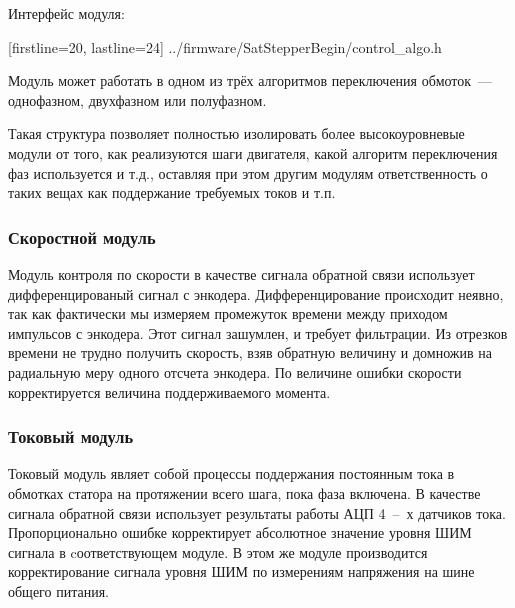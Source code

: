 Интерфейс модуля:

    [firstline=20, lastline=24]
    {../firmware/SatStepperBegin/control_algo.h}

Модуль может работать в одном из трёх
алгоритмов переключения обмоток~--- однофазном, двухфазном или полуфазном.

Такая структура позволяет полностью изолировать более высокоуровневые модули от
того, как реализуются шаги двигателя, какой алгоритм переключения фаз
используется и т.д., оставляя при этом другим модулям ответственность о таких
вещах как поддержание требуемых токов и т.п.

\subsubsection{Скоростной модуль}
Модуль контроля по скорости в качестве сигнала обратной связи использует
дифференцированый сигнал с энкодера. Дифференцирование происходит неявно,
так как фактически мы измеряем промежуток времени между приходом импульсов с
энкодера. Этот сигнал зашумлен, и требует фильтрации.
Из отрезков времени не трудно получить скорость, взяв обратную величину и
домножив на радиальную меру одного отсчета энкодера. По величине ошибки скорости
корректируется величина поддерживаемого момента.

\subsubsection{Токовый модуль}
Токовый модуль являет собой процессы поддержания постоянным тока в обмотках
статора на протяжении всего шага, пока фаза включена. В качестве сигнала
обратной связи использует результаты работы АЦП 4~--~х датчиков тока.
Пропорционально ошибке корректирует абсолютное значение уровня ШИМ сигнала в
cоответствующем модуле. В этом же модуле производится корректирование сигнала
уровня ШИМ по измерениям напряжения на шине общего питания.
